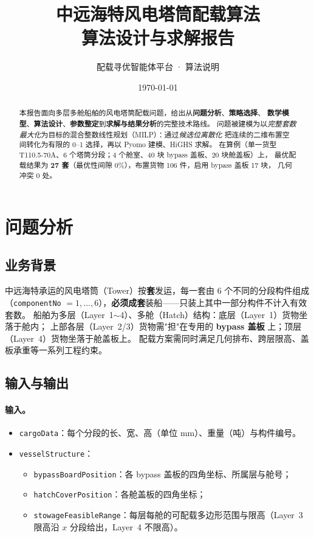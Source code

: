 \documentclass[11pt]{article}
\title{\textbf{中远海特风电塔筒配载算法}\\[4pt]\large 算法设计与求解报告}
\author{配载寻优智能体平台 · 算法说明}
\date{\today}
\begin{document}
\maketitle

\begin{abstract}
\noindent
本报告面向多层多舱船舶的风电塔筒配载问题，给出从\textbf{问题分析}、\textbf{策略选择}、
\textbf{数学模型}、\textbf{算法设计}、\textbf{参数整定}到\textbf{求解与结果分析}的完整技术路线。
问题被建模为以\emph{完整套数最大化}为目标的混合整数线性规划（MILP）：通过\emph{候选位离散化}
把连续的二维布置空间转化为有限的 0--1 选择，再以 Pyomo 建模、HiGHS 求解。
在算例（单一货型 T110.5-70A、6 个塔筒分段；4 个舱室、40 块 bypass 盖板、20 块舱盖板）上，
最优配载结果为 \textbf{27 套}（最优性间隙 $0\%$），布置货物 106 件，启用 bypass 盖板 17 块，
几何冲突 0 处。
\end{abstract}

\tableofcontents
\bigskip

\section{问题分析}

\subsection{业务背景}
中远海特承运的风电塔筒（Tower）按\textbf{套}发运，每一套由 6 个不同的分段构件组成
（\texttt{componentNo} $=1,\dots,6$），\textbf{必须成套}装船——只装上其中一部分构件不计入有效套数。
船舶为多层（Layer~1$\sim$4）、多舱（Hatch）结构：底层（Layer~1）货物坐落于舱内；
上部各层（Layer~2/3）货物需"担"在专用的 \textbf{bypass 盖板} 上；顶层（Layer~4）货物坐落于舱盖板上。
配载方案需同时满足几何排布、跨层限高、盖板承重等一系列工程约束。

\subsection{输入与输出}
\paragraph{输入。}
\begin{itemize}[leftmargin=1.8em,itemsep=2pt]
  \item \texttt{cargoData}：每个分段的长、宽、高（单位 mm）、重量（吨）与构件编号。
  \item \texttt{vesselStructure}：
    \begin{itemize}[itemsep=1pt]
      \item \texttt{bypassBoardPosition}：各 bypass 盖板的四角坐标、所属层与舱号；
      \item \texttt{hatchCoverPosition}：各舱盖板的四角坐标；
      \item \texttt{stowageFeasibleRange}：每层每舱的可配载多边形范围与限高（Layer~3 限高沿 $x$ 分段给出，Layer~4 不限高）。
    \end{itemize}
\end{itemize}
\end{document}
